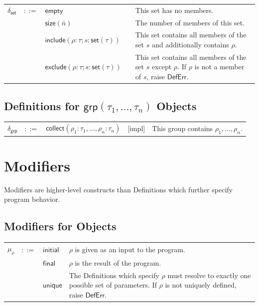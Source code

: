 \documentclass[twoside,11pt]{report}
\begin{document}
\noindent\begin{tabularx}{\textwidth}{l l l c X}
$\delta_{\mathsf{set}}$ & $::=$ & $\mathsf{empty}$ &  & This set has no members. \\
 & & $\mathsf{size}(\bar{n})$ &  & The number of members of this set. \\
 & & $\mathsf{include}(\rho : \tau; s : \mathsf{set}(\tau))$ &  & This set contains all members of the set $s$ and additionally contains $\rho$. \\
 & & $\mathsf{exclude}(\rho : \tau; s : \mathsf{set}(\tau))$ &  & This set contains all members of the set $s$ except $\rho$. If $\rho$ is not a member of $s$, raise $\mathsf{DefErr}$.
\end{tabularx}

\subsection{Definitions for $\mathsf{grp}(\tau_1, \dots , \tau_n)$ Objects}
\label{subsec:def-grp}

\noindent\begin{tabularx}{\textwidth}{l l l c X}
$\delta_{\mathsf{grp}}$ & $::=$ & $\mathsf{collect}(\rho_1 : \tau_1, \dots, \rho_n : \tau_n)$ & [impl] & This group contains $\rho_1, \dots, \rho_n$.
\end{tabularx}


\section{Modifiers}
\label{sec:mods}

Modifiers are higher-level constructs than Definitions which further specify program behavior.

\subsection{Modifiers for Objects}
\label{subsec:mods-obj}

\begin{tabularx}{\textwidth}{l l l X}
$\mu_{\rho}$ & $::=$ & $\mathsf{initial}$ & $\rho$ is given as an input to the program. \\
 & & $\mathsf{final}$ & $\rho$ is the result of the program. \\
 & & $\mathsf{unique}$ & The Definitions which specify $\rho$ must resolve to exactly one possible set of parameters. If $\rho$ is not uniquely defined, raise $\mathsf{DefErr}$.
\end{tabularx}
\end{document}
